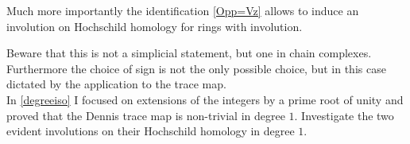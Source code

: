 Much more importantly the identification \ref{Opp=Vz} allows to induce an involution on Hochschild homology for rings with involution.


Beware that this is not a simplicial statement, but one in chain complexes. Furthermore the
choice of sign is not the only possible choice, but in this case dictated by the application to the trace map.\\[1ex]

In \ref{degreeiso} I focused on extensions of the integers by a prime root of unity and proved that the Dennis trace
map is non-trivial in degree $1$. Investigate the two evident involutions on their Hochschild homology in degree $1$.

